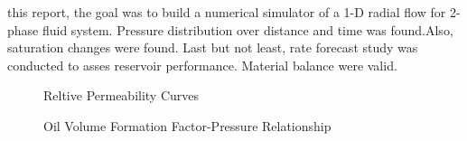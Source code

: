 \documentclass[12pt,letterpaper,titlepage]{article}
\begin{document}
\par this report, the goal was to build a numerical simulator of a 1-D radial flow for 2-phase fluid system. Pressure distribution over distance and time was found.Also, saturation changes were found. Last but not least, rate forecast study was conducted to asses reservoir performance. Material balance were valid.
\begin{figure}[p]
\centering
{}
\caption{\label{Kr}Reltive Permeability Curves}
\end{figure}
\begin{figure}[p]
\centering
{}
\caption{\label{Bo}Oil Volume Formation Factor-Pressure Relationship }
\end{figure}
\end{document}
